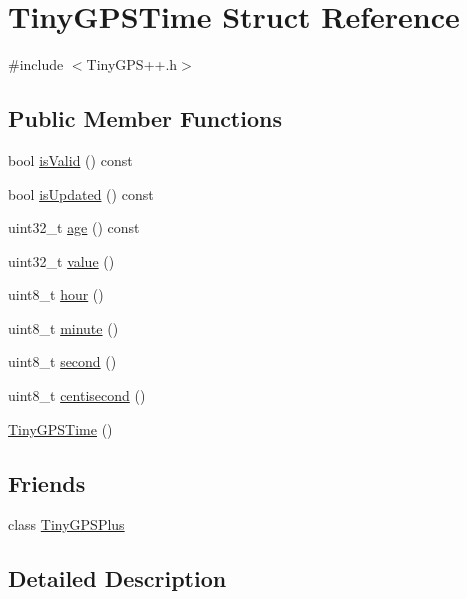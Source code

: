 \hypertarget{struct_tiny_g_p_s_time}{}\section{Tiny\+G\+P\+S\+Time Struct Reference}
\label{struct_tiny_g_p_s_time}


{\ttfamily \#include $<$Tiny\+G\+P\+S++.\+h$>$}

\subsection*{Public Member Functions}
\begin{DoxyCompactItemize}
\item 
bool \hyperlink{struct_tiny_g_p_s_time_a85c38acaf804aecefc3f0358bf93d86a}{is\+Valid} () const 
\item 
bool \hyperlink{struct_tiny_g_p_s_time_a48850598e5ae6dd6813bbfd5af7589fc}{is\+Updated} () const 
\item 
uint32\+\_\+t \hyperlink{struct_tiny_g_p_s_time_a22b59e1d4b22435baa2a4446981f2dce}{age} () const 
\item 
uint32\+\_\+t \hyperlink{struct_tiny_g_p_s_time_afcdb632fee9d144b1414c9d7b95719f1}{value} ()
\item 
uint8\+\_\+t \hyperlink{struct_tiny_g_p_s_time_a37fdb629b6ed0e31134214c7d07df2b1}{hour} ()
\item 
uint8\+\_\+t \hyperlink{struct_tiny_g_p_s_time_aef83c20c14d404219299da2d7e35cdce}{minute} ()
\item 
uint8\+\_\+t \hyperlink{struct_tiny_g_p_s_time_a729cab36ced07eb5607503663fbe33e8}{second} ()
\item 
uint8\+\_\+t \hyperlink{struct_tiny_g_p_s_time_a1f74ad4a2a53e0ee19f8e3a6b2bc985f}{centisecond} ()
\item 
\hyperlink{struct_tiny_g_p_s_time_abd6dd7a576fd42cd6980c92eec77ab1d}{Tiny\+G\+P\+S\+Time} ()
\end{DoxyCompactItemize}
\subsection*{Friends}
\begin{DoxyCompactItemize}
\item 
class \hyperlink{struct_tiny_g_p_s_time_a6501fd5ef19ae166d43e0e5781609ee2}{Tiny\+G\+P\+S\+Plus}
\end{DoxyCompactItemize}


\subsection{Detailed Description}


